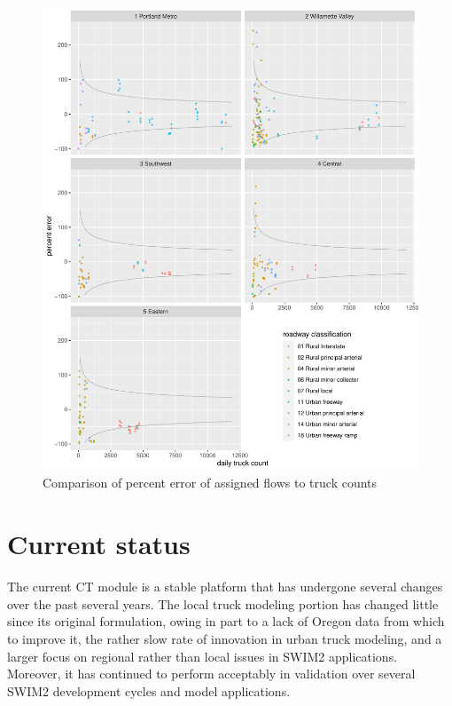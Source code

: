 \begin{figure}
\centering
\includegraphics[width=6.5in]{figures/graph-final-validation-trumpet.pdf}
\caption{Comparison of percent error of assigned flows to truck counts}
\label{fig:ct-mde-comparison}
\end{figure}

\section{Current status}

The current CT module is a stable platform that has undergone several changes over the past several years. The local truck modeling portion has changed little since its original formulation, owing in part to a lack of Oregon data from which to improve it, the rather slow rate of innovation in urban truck modeling, and a larger focus on regional rather than local issues in SWIM2 applications. Moreover, it has continued to perform acceptably in validation over several SWIM2 development cycles and model applications. 

